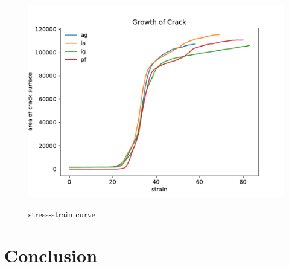 \documentclass[preview,times]{elsarticle}
\begin{document}
\begin{figure}
	\centering
	\includegraphics[width=1\linewidth]{img/crack_surf}
	\label{fig:surf}
	\caption{stress-strain curve}
\end{figure}

\section{Conclusion}
%


\end{document}
